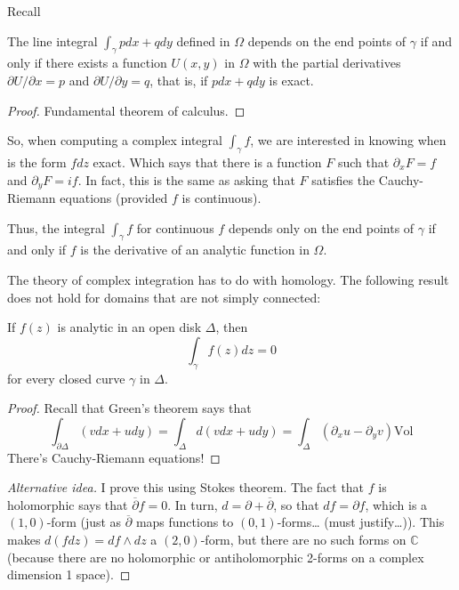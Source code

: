 Recall
\begin{theorem}[Stokes]
\label{theorem-Stokes}
\begin{reference}
\cite[Chapter 4, Theorem 1]{ahl}
\end{reference}
The line integral $\int_\gamma p dx +q dy$ defined in $\Omega$ depends on the
end points of $\gamma$ if and only if there exists a function $U(x,y)$ in
$\Omega$ with the partial derivatives $\partial U/\partial x=p$ and 
$\partial U/\partial y=q$, that is, if $pdx +qdy$ is exact.
\end{theorem}

\begin{proof}
Fundamental theorem of calculus.
\end{proof}

\noindent
So, when computing a complex integral $\int_\gamma f$, we are interested in
knowing when is the form $fdz$ exact. Which says that there is a function $F$
such that $\partial_x F=f$ and $\partial_y F=if$. In fact, this is the same as
asking that $F$ satisfies the Cauchy-Riemann equations (provided $f$ is
continuous).

Thus, the integral $\int_\gamma f$ for continuous $f$ depends only on the end
points of $\gamma$ if and only if $f$ is the derivative of an analytic function
in $\Omega$.

\medskip\noindent
The theory of complex integration has to do with homology. The following
result does not hold for domains that are not simply connected:

\begin{theorem}[Cauchy]
\label{theorem-Cauchy}
If $f(z)$ is analytic in an open disk $\Delta$, then
\begin{equation}
\label{equation-Cauchy-theorem}
\int_\gamma f(z)dz=0
\end{equation}
for every closed curve $\gamma$ in $\Delta$.
\end{theorem}

\begin{proof}
Recall that Green's theorem says that
$$
\int_{\partial\Delta}(vdx+udy)=\int_\Delta d(vdx+udy)
=\int_\Delta(\partial_xu-\partial_yv)\text{Vol}
$$
There's Cauchy-Riemann equations!
\end{proof}

\begin{proof}[Alternative idea]
I prove this using Stokes theorem. The fact that $f$ is holomorphic says that
$\overline{\partial}f=0$. In turn, $d=\partial+\overline{\partial}$, so that
$df=\partial f$, which is a $(1,0)$-form (just as $\overline{\partial}$ maps
functions to $(0,1)$-forms… (must justify…)). This makes $d(fdz)=df\wedge dz$ a
$(2,0)$-form, but there are no such forms on $\mathbb{C}$ (because there are no
holomorphic or antiholomorphic 2-forms on a complex dimension 1 space).
\end{proof}

